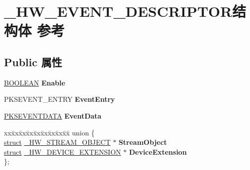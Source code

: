\hypertarget{struct___h_w___e_v_e_n_t___d_e_s_c_r_i_p_t_o_r}{}\section{\+\_\+\+H\+W\+\_\+\+E\+V\+E\+N\+T\+\_\+\+D\+E\+S\+C\+R\+I\+P\+T\+O\+R结构体 参考}
\label{struct___h_w___e_v_e_n_t___d_e_s_c_r_i_p_t_o_r}
\subsection*{Public 属性}
\begin{DoxyCompactItemize}
\item 
\mbox{\label{struct___h_w___e_v_e_n_t___d_e_s_c_r_i_p_t_o_r_af76f818c14f2f8a0e7d6d4b3ac471e0f}} 
\hyperlink{_processor_bind_8h_a112e3146cb38b6ee95e64d85842e380a}{B\+O\+O\+L\+E\+AN} {\bfseries Enable}
\item 
\mbox{\label{struct___h_w___e_v_e_n_t___d_e_s_c_r_i_p_t_o_r_ad81734087705cd6188aec03de48ffbf6}} 
P\+K\+S\+E\+V\+E\+N\+T\+\_\+\+E\+N\+T\+RY {\bfseries Event\+Entry}
\item 
\mbox{\label{struct___h_w___e_v_e_n_t___d_e_s_c_r_i_p_t_o_r_af9139c1f1655a4073361d46f48327b37}} 
\hyperlink{struct_k_s_e_v_e_n_t_d_a_t_a}{P\+K\+S\+E\+V\+E\+N\+T\+D\+A\+TA} {\bfseries Event\+Data}
\item 
\mbox{\label{struct___h_w___e_v_e_n_t___d_e_s_c_r_i_p_t_o_r_a3f65a043e8c7249993774fbec7869c86}} 
\begin{tabbing}
xx\=xx\=xx\=xx\=xx\=xx\=xx\=xx\=xx\=\kill
union \{\\
\>\hyperlink{interfacestruct}{struct} \hyperlink{struct___h_w___s_t_r_e_a_m___o_b_j_e_c_t}{\_HW\_STREAM\_OBJECT} $\ast$ {\bfseries StreamObject}\\
\>\hyperlink{interfacestruct}{struct} \hyperlink{struct___h_w___d_e_v_i_c_e___e_x_t_e_n_s_i_o_n}{\_HW\_DEVICE\_EXTENSION} $\ast$ {\bfseries DeviceExtension}\\
\}; \\


\end{tabbing}
\end{DoxyCompactItemize}
